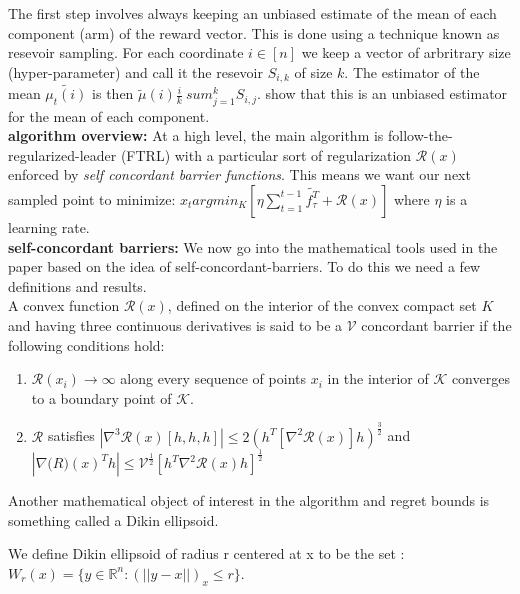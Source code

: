 The first step involves always keeping an unbiased estimate of the mean of each component (arm) of 
the reward vector. This is done using a technique known as resevoir sampling.
For each coordinate $i\in[n]$ we keep a vector of arbritrary size (hyper-parameter) and call it the resevoir $S_{i, k}$ of size $k$.
The estimator of the mean $\tilde{\mu_t(i)}$ is then  $\tilde{\mu}(i) \frac{i}{k} \ sum_{j=1}^kS_{i, j}$. 
\citep{hazan} show that this is an unbiased estimator for the mean of each component.\\


\textbf{algorithm overview:}
At a high level, the main algorithm is follow-the-regularized-leader (FTRL) with a particular
sort of regularization  $\mathcal{R}(x)$ enforced by \textit{self concordant barrier functions}. This means we want our next sampled point 
to minimize:  $x_t  argmin_{K}[\eta \sum_{t=1}^{t-1} \tilde{f_{\tau}^T} + \mathcal{R}(x)]$ where $\eta$ is a learning rate. \\

\textbf{self-concordant barriers:}
We now go into the mathematical tools used in the paper based on the idea of self-concordant-barriers. To do this we need a few definitions and results.\\

A convex function $\mathcal{R}(x)$,  defined on the interior of the convex compact set $K$ and having three continuous derivatives is said to be a $\mathcal{V}$ concordant barrier if the following 
conditions hold:

\begin{enumerate}
\item
  $\mathcal{R}(x_i) \rightarrow \infty$ along every sequence of points $x_i$ in the interior of $\mathcal{K}$ converges to a boundary point of $\mathcal{K}$.

\item
$\mathcal{R}$ satisfies $|\nabla^3 \mathcal{R}(x) [h, h, h]| \leq 2(h^T [\nabla^2 \mathcal{R}(x)]h)^{\frac{3}{2}}$ and $|\nabla \mathcal(R)(x)^T h| \leq \mathcal{V}^{\frac{1}{2}}[h^T \nabla^2 \mathcal{R}(x) h]^\frac{1}{2}$

\end{enumerate}

Another mathematical object of interest in the algorithm
and regret bounds is something called a Dikin ellipsoid.

We define Dikin ellipsoid of radius r centered at x to be the set :
$W_r(x) = \{ y \in  \mathbb{R}^n : (||y - x||)_x \leq r \}$.

